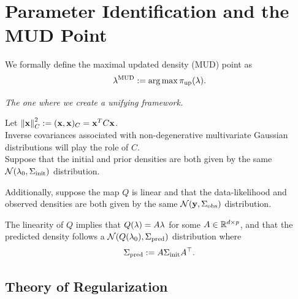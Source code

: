 \section{Parameter Identification and the MUD Point}

\begin{frame}

\centering
We formally define the maximal updated density (MUD) point as
\begin{equation}\label{eq:mudpt_inital_defn}
	\lambda^{\text{MUD}} := \operatorname*{arg\,max} {\operatorname*{\pi_{up}}}(\lambda).
\end{equation}

\end{frame}

\begin{frame}[t]{\it The one where we create a unifying framework.}

Let $\left\Vert\mathbf{x}\right\Vert_C^2 := (\mathbf{x}, \mathbf{x})_C = \mathbf{x}^T C \mathbf{x}$. \\

Inverse covariances associated with non-degenerative multivariate Gaussian distributions will play the role of $C$. \\

Suppose that the initial and prior densities are both given by the same $\mathcal{N}(\lambda_0, \Sigma_\text{init})$ distribution.

\vskip 12pt
Additionally, suppose the map $Q$ is linear and that the data-likelihood and observed densities are both given by the same $\mathcal{N}(\mathbf{y}, \Sigma_\text{obs})$ distribution.

\vskip 12pt
The linearity of $Q$ implies that $Q(\lambda)=A\lambda$ for some $A\in\mathbb{R}^{d\times p}$, and that the predicted density follows a $\mathcal{N}(Q(\lambda_0), \Sigma_\text{pred})$ distribution where
\begin{equation}\label{eq:predictCov}
	\Sigma_\text{pred} := A\Sigma_\text{init} A^\top.
\end{equation}

\end{frame}

\subsection{Theory of Regularization}

